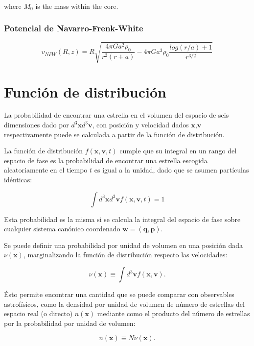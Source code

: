 where $M_0$ is the mass within the core.

\subsubsection{Potencial de Navarro-Frenk-White \cite{B15}}
\begin{equation}
v_{NFW} (R, z) = R \sqrt{   \frac{4\pi G a^2 \rho_0}{r^2(r+a)} - 4\pi G a^3 \rho_0\frac{log(r/a)+1}{r^{3/2}}  } 
\end{equation}

\section{Función de distribución}

La probabilidad de encontrar una estrella en el volumen del espacio de seis dimensiones dado por $d^3\textbf{x} d^3\textbf{v}$, con posición y velocidad dados $\textbf{x}, \textbf{v}$ respectivamente puede se calculada a partir de la función de distribución.

La función de distribución  $f (\textbf{x} ,\textbf{v}, t)$ cumple que su integral en un rango del espacio de fase es la probabilidad de encontrar una estrella escogida aleatoriamente en el tiempo $t$ es igual a la unidad, dado que se asumen partículas  idénticas:

$$ \int d^3\textbf{x} d^3\textbf{v} f (\textbf{x} ,\textbf{v}, t)  = 1 $$

Esta probabilidad es la misma si se calcula la integral del espacio de fase sobre cualquier sistema canónico coordenado $ \textbf{w} = (\textbf{q}, \textbf{p})$.

Se puede definir una probabilidad por unidad de volumen en una posición dada $\nu( \textbf{x} ) $, marginalizando la función de distribución respecto las velocidades:

\begin{equation}
\label{Dens_prob}
\nu( \textbf{x} ) \equiv \int d^3\textbf{v} f(\textbf{x}, \textbf{v}).
\end{equation}


Ésto permite encontrar una cantidad que se puede comparar con observables astrofísicos, como la densidad por unidad de volumen de número de estrellas del espacio real (o directo) $n ( \textbf{x} ) $ mediante como el producto del número de estrellas por la probabilidad por unidad de volumen:

$$ n ( \textbf{x} ) \equiv N \nu(\textbf{x} ). $$

